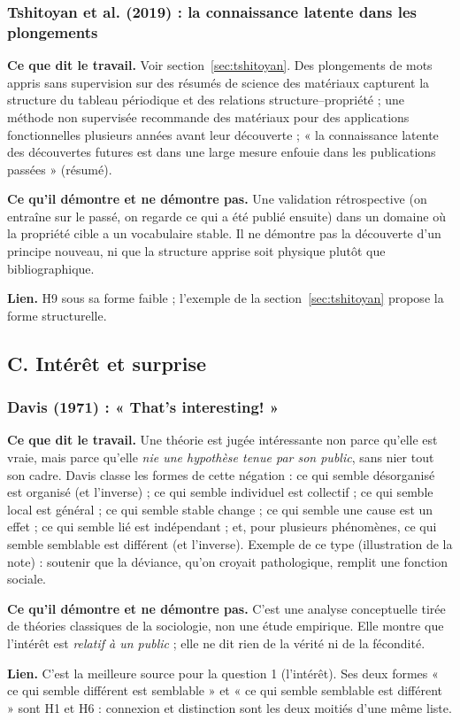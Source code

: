 \documentclass[a4paper,11pt]{article}
\newcommand{\cours}[1]{\par\smallskip\textbf{\textsf{#1}}\enspace}
\begin{document}
\subsubsection{Tshitoyan et al. (2019) : la connaissance latente dans les plongements}
\cours{Ce que dit le travail.} Voir section~\ref{sec:tshitoyan}. Des plongements de mots appris sans supervision sur des résumés de science des matériaux capturent la structure du tableau périodique et des relations structure–propriété ; une méthode non supervisée recommande des matériaux pour des applications fonctionnelles plusieurs années avant leur découverte ; « la connaissance latente des découvertes futures est dans une large mesure enfouie dans les publications passées » (résumé).
\cours{Ce qu'il démontre et ne démontre pas.} Une validation rétrospective (on entraîne sur le passé, on regarde ce qui a été publié ensuite) dans un domaine où la propriété cible a un vocabulaire stable. Il ne démontre pas la découverte d'un principe nouveau, ni que la structure apprise soit physique plutôt que bibliographique.
\cours{Lien.} H9 sous sa forme faible ; l'exemple de la section~\ref{sec:tshitoyan} propose la forme structurelle.
\subsection*{C. Intérêt et surprise}

\subsubsection{Davis (1971) : « That's interesting! »}
\cours{Ce que dit le travail.} Une théorie est jugée intéressante non parce qu'elle est vraie, mais parce qu'elle \emph{nie une hypothèse tenue par son public}, sans nier tout son cadre. Davis classe les formes de cette négation : ce qui semble désorganisé est organisé (et l'inverse) ; ce qui semble individuel est collectif ; ce qui semble local est général ; ce qui semble stable change ; ce qui semble une cause est un effet ; ce qui semble lié est indépendant ; et, pour plusieurs phénomènes, ce qui semble semblable est différent (et l'inverse). Exemple de ce type (illustration de la note) : soutenir que la déviance, qu'on croyait pathologique, remplit une fonction sociale.
\cours{Ce qu'il démontre et ne démontre pas.} C'est une analyse conceptuelle tirée de théories classiques de la sociologie, non une étude empirique. Elle montre que l'intérêt est \emph{relatif à un public} ; elle ne dit rien de la vérité ni de la fécondité.
\cours{Lien.} C'est la meilleure source pour la question 1 (l'intérêt). Ses deux formes « ce qui semble différent est semblable » et « ce qui semble semblable est différent » sont H1 et H6 : connexion et distinction sont les deux moitiés d'une même liste.
\end{document}
